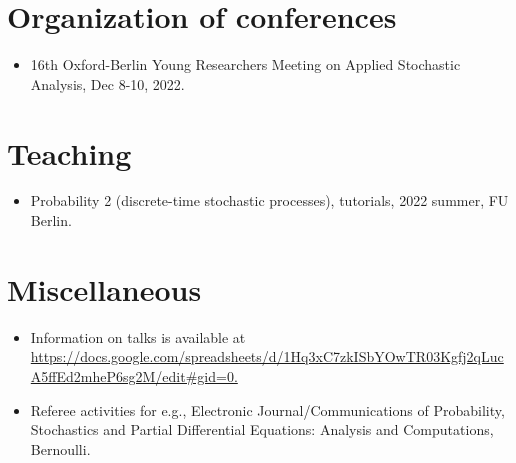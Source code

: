 \documentclass[12pt]{article}
\begin{document}
\nocite{*}
\printbibliography[title=Preprints, type=misc]
\printbibliography[title=Published, type=article]

\section{Organization of conferences}
\begin{itemize}
    \item 16th Oxford-Berlin Young Researchers Meeting on Applied Stochastic Analysis, Dec 8-10, 2022.
\end{itemize}

\section{Teaching}
\begin{itemize}
    \item Probability 2 (discrete-time stochastic processes), tutorials, 2022 summer, FU Berlin.
\end{itemize}
\section{Miscellaneous}
\begin{itemize}
    \item Information on talks is available at \url{https://docs.google.com/spreadsheets/d/1Hq3xC7zkISbYOwTR03Kgfj2qLucA5ffEd2mheP6sg2M/edit#gid=0.}
    \item Referee activities for e.g., Electronic Journal/Communications of Probability, Stochastics and Partial Differential Equations: Analysis and Computations, Bernoulli.
\end{itemize}
\end{document}
